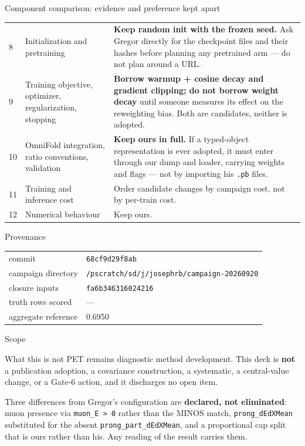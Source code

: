 \documentclass[aspectratio=169,10pt]{beamer}
\begin{document}
\begin{frame}{Component comparison: evidence and preference kept apart}
\begin{center}
\begin{tabular}{p{0.2cm}p{3.4cm}p{9.4cm}}
$$8 & Initialization and pretraining & \textbf{Keep random init with the frozen seed.} Ask Gregor directly for the checkpoint files and their hashes before planning any pretrained arm --- do not plan around a URL. \\
9 & Training objective, optimizer, regularization, stopping & \textbf{Borrow warmup + cosine decay and gradient clipping; do not borrow weight decay} until someone measures its effect on the reweighting bias. Both are candidates, neither is adopted. \\
10 & OmniFold integration, ratio conventions, validation & \textbf{Keep ours in full.} If a typed-object representation is ever adopted, it must enter through our dump and loader, carrying weights and flags --- not by importing his \texttt{.pb} files. \\
11 & Training and inference cost & Order candidate changes by campaign cost, not by per-train cost. \\
12 & Numerical behaviour & Keep ours. \\
\bottomrule
\end{tabular}
\end{center}
\end{frame}

\begin{frame}{Provenance}
\begin{center}\small
\begin{tabular}{ll}
\toprule
commit & \texttt{68cf9d29f8ab} \\
campaign directory & \texttt{/pscratch/sd/j/josephrb/campaign-20260920} \\
closure inputs & \texttt{fa6b346316024216} \\
truth rows scored & --- \\
aggregate reference & 0.6950 \\
\bottomrule
\end{tabular}
\end{center}
\end{frame}

\begin{frame}{Scope}
\begin{alertblock}{What this is not}
PET remains diagnostic method development. This deck is \textbf{not} a
publication adoption, a covariance construction, a systematic, a central-value
change, or a Gate-6 action, and it discharges no open item.
\end{alertblock}
Three differences from Gregor's configuration are \textbf{declared, not
eliminated}: muon presence via \texttt{muon\_E > 0} rather than the MINOS
match, \texttt{prong\_dEdXMean} substituted for the absent
\texttt{prong\_part\_dEdXMean}, and a proportional cap split that is ours
rather than his. Any reading of the result carries them.
\end{frame}
\end{document}
